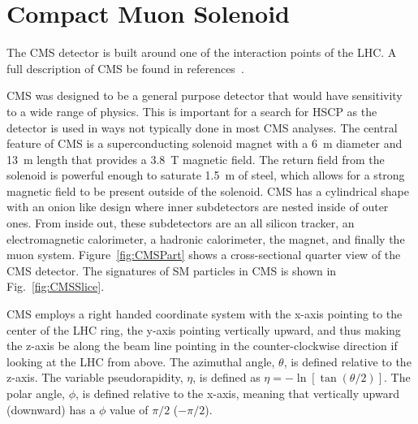 \section{Compact Muon Solenoid}

The CMS detector is built around one of the interaction points of the LHC. A full description of CMS be found in 
references~\cite{Chatrchyan:2008zzk, Bayatian:922757}.

CMS was designed to be a general purpose detector that would have sensitivity to a wide range of physics. This is important for a search for HSCP as the detector
is used in ways not typically done in most CMS analyses.
The central feature of CMS is a superconducting solenoid magnet with a 6~m diameter and 13~m length that provides a 3.8~T magnetic field. The return field from the solenoid
is powerful enough to saturate 1.5~m of steel, which allows for a strong magnetic field to be present outside of the solenoid.
CMS has a cylindrical shape with an onion like design where inner subdetectors are nested inside of outer ones. From inside out, these subdetectors are an all silicon
tracker, an electromagnetic calorimeter, a hadronic calorimeter, the magnet, and finally the muon system. 
Figure~\ref{fig:CMSPart} shows a cross-sectional quarter view of the CMS detector.
The signatures of SM particles in CMS is shown in Fig.~\ref{fig:CMSSlice}.

CMS employs a right handed coordinate system with the x-axis pointing to the center of the LHC ring, the y-axis pointing vertically upward, and thus making the z-axis
be along the beam line pointing in the counter-clockwise direction if looking at the LHC from above. The azimuthal angle, $\theta$, is defined relative to the z-axis. The variable
pseudorapidity, $\eta$, is defined as $\eta = -\ln{[\tan{(\theta/2)}]}$. The polar angle, $\phi$, is defined relative to the x-axis, meaning that vertically
upward (downward) has a $\phi$ value of $\pi/2$ ($-\pi/2$).


